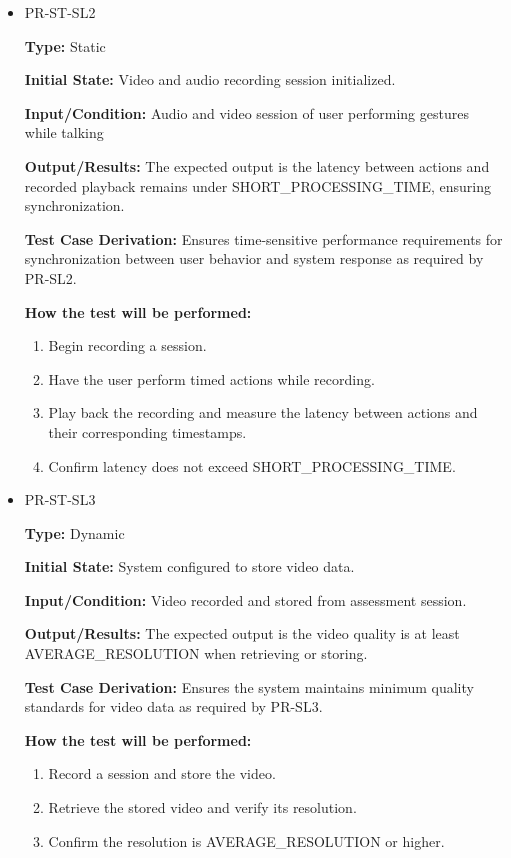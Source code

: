 \documentclass[12pt, titlepage]{article}
\begin{document}
\begin{itemize}
  \item PR-ST-SL2
  \begin{mdframed}[linewidth=0.5mm]
      \textbf{Type:} Static \par
      \textbf{Initial State:} Video and audio recording session initialized. \par
      \textbf{Input/Condition:} Audio and video session of user performing gestures while talking \par
      \textbf{Output/Results:} The expected output is the latency between actions and \\ recorded playback remains under SHORT\_PROCESSING\_TIME, ensuring \\ synchronization. \par
      \textbf{Test Case Derivation:} Ensures time-sensitive performance requirements for synchronization between user behavior and system response as required by PR-SL2. \par
      \textbf{How the test will be performed:}
      \begin{enumerate}[noitemsep]
        \item Begin recording a session.
        \item Have the user perform timed actions while recording.
        \item Play back the recording and measure the latency between actions and their corresponding timestamps.
        \item Confirm latency does not exceed SHORT\_PROCESSING\_TIME.
      \end{enumerate}
  \end{mdframed}

  \item PR-ST-SL3
  \begin{mdframed}[linewidth=0.5mm]
      \textbf{Type:} Dynamic \par
      \textbf{Initial State:} System configured to store video data. \par
      \textbf{Input/Condition:} Video recorded and stored from assessment session. \par
      \textbf{Output/Results:} The expected output is the video quality is at least \\ AVERAGE\_RESOLUTION when retrieving or storing. \par
      \textbf{Test Case Derivation:} Ensures the system maintains minimum quality standards for video data as required by PR-SL3. \par
      \textbf{How the test will be performed:}
      \begin{enumerate}[noitemsep]
        \item Record a session and store the video.
        \item Retrieve the stored video and verify its resolution.
        \item Confirm the resolution is AVERAGE\_RESOLUTION or higher.
      \end{enumerate}
  \end{mdframed}
\end{itemize}
\end{document}
